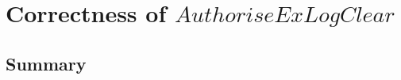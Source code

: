 \chapter[$AuthoriseExLogClear$]{Correctness of $AuthoriseExLogClear$}\label{ch23}

\newpage
\section{Summary}\label{ch23.summary}

\ldefsummary %
\lthmsummary %
\lthmaddeddefsummary %
\lthmaddedthmsummary %
\lzevessummary %
